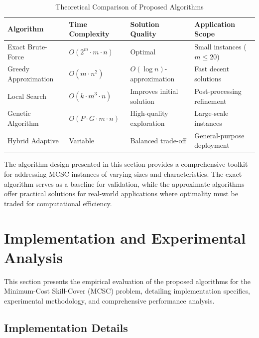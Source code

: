 \documentclass[12pt,a4paper]{article}
\begin{document}
\begin{table}[ht]
	\centering
	\caption{Theoretical Comparison of Proposed Algorithms}
	\label{tab:algorithm-comparison}
	\begin{tabularx}{\linewidth}{@{}>{\raggedright\arraybackslash}p{3.5cm}>{\raggedright\arraybackslash}p{3cm}>{\raggedright\arraybackslash}p{3.5cm}>{\raggedright\arraybackslash}p{5cm}@{}}
		\toprule
		\textbf{Algorithm} & \textbf{Time Complexity} & \textbf{Solution Quality} & \textbf{Application Scope} \\
		\midrule
		Exact Brute-Force & $O(2^m \cdot m \cdot n)$ & Optimal & Small instances ($m \leq 20$) \\ \addlinespace
		Greedy Approximation & $O(m\cdot n^2)$ & $O(\log n)$-approximation & Fast decent solutions \\ \addlinespace
		Local Search & $O(k \cdot m^3 \cdot n)$ & Improves initial solution & Post-processing refinement \\ \addlinespace
		Genetic Algorithm & $O(P \cdot G \cdot m \cdot n)$ & High-quality exploration & Large-scale instances \\ \addlinespace
		Hybrid Adaptive & Variable & Balanced trade-off & General-purpose deployment \\
		\bottomrule
	\end{tabularx}
\end{table}

The algorithm design presented in this section provides a comprehensive toolkit for addressing MCSC instances of varying sizes and characteristics. The exact algorithm serves as a baseline for validation, while the approximate algorithms offer practical solutions for real-world applications where optimality must be traded for computational efficiency.
	
\section{Implementation and Experimental Analysis}
\label{sec:experimental-analysis}

This section presents the empirical evaluation of the proposed algorithms for the Minimum-Cost Skill-Cover (MCSC) problem, detailing implementation specifics, experimental methodology, and comprehensive performance analysis.

\subsection{Implementation Details}
\label{subsec:implementation-details}
\end{document}
